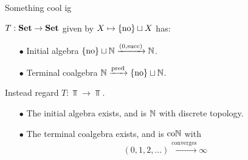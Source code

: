 
\begin{frame}{Something cool ig} %
  
  \par $T : \operatorname{\mathbf{Set}} \to \operatorname{\mathbf{Set}}$ given by $X \mapsto \{\mathrm{no}\} \sqcup X$ has:

  \begin{itemize}
    \item[$\bullet$] {
      Initial algebra $\{\mathrm{no}\} \sqcup \mathbb{N} \xrightarrow{(0, \operatorname{succ})} \mathbb{N}$.
    }
    \item[$\bullet$] {
      Terminal coalgebra $\mathbb{N} \xrightarrow{\operatorname{pred}} \{\mathrm{no}\} \sqcup \mathbb{N}$.
    }
  \end{itemize}

  \vspace{1.5 \baselineskip}

  \pause

  \par Instead regard $T : \Top \to \Top$.
  \vspace{0.5 \baselineskip}

  \pause

  \begin{itemize}
    \item[$\bullet$] {
      The initial algebra exists, and is $\mathbb{N}$ with discrete topology.
    }\pause
    \item[$\bullet$] {
      The terminal coalgebra exists, and is $\mathrm{co}\mathbb{N}$ with
      \begin{align*}
        (0, 1, 2, \dots) \xrightarrow{\text{converges}} \infty
      \end{align*}
    }
  \end{itemize}

\end{frame}
